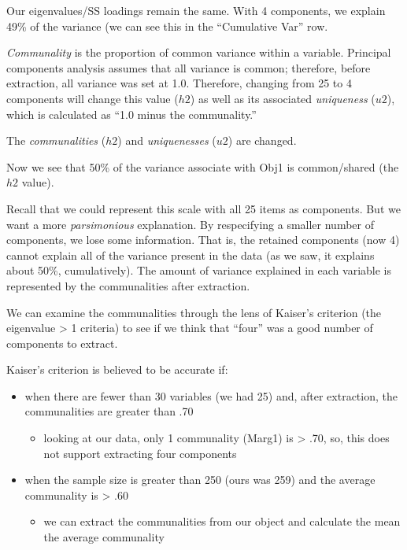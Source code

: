 \documentclass[
  english,
]{book}
\providecommand{\tightlist}{%
  \setlength{\itemsep}{0pt}\setlength{\parskip}{0pt}}
\begin{document}
Our eigenvalues/SS loadings remain the same. With 4 components, we explain 49\% of the variance (we can see this in the ``Cumulative Var'' row.

\emph{Communality} is the proportion of common variance within a variable. Principal components analysis assumes that all variance is common; therefore, before extraction, all variance was set at 1.0. Therefore, changing from 25 to 4 components will change this value (\(h2\)) as well as its associated \emph{uniqueness} (\(u2\)), which is calculated as ``1.0 minus the communality.''

The \emph{communalities} (\(h2\)) and \emph{uniquenesses} (\(u2\)) are changed.

Now we see that 50\% of the variance associate with Obj1 is common/shared (the \(h2\) value).

Recall that we could represent this scale with all 25 items as components. But we want a more \emph{parsimonious} explanation. By respecifying a smaller number of components, we lose some information. That is, the retained components (now 4) cannot explain all of the variance present in the data (as we saw, it explains about 50\%, cumulatively). The amount of variance explained in each variable is represented by the communalities after extraction.

We can examine the communalities through the lens of Kaiser's criterion (the eigenvalue \textgreater{} 1 criteria) to see if we think that ``four'' was a good number of components to extract.

Kaiser's criterion is believed to be accurate if:

\begin{itemize}
\tightlist
\item
  when there are fewer than 30 variables (we had 25) and, after extraction, the communalities are greater than .70

  \begin{itemize}
  \tightlist
  \item
    looking at our data, only 1 communality (Marg1) is \textgreater{} .70, so, this does not support extracting four components
  \end{itemize}
\item
  when the sample size is greater than 250 (ours was 259) and the average communality is \textgreater{} .60

  \begin{itemize}
  \tightlist
  \item
    we can extract the communalities from our object and calculate the mean the average communality
  \end{itemize}
\end{itemize}
\end{document}
